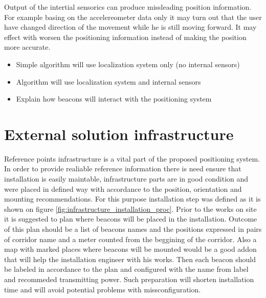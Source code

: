\documentclass[../main.tex]{subfiles}
\begin{document}
Output of the intertial sensorics can produce missleading position information. For example basing on the accelereometer data only it may turn out that the user have changed direction of the movement while he is still moving forward. It may effect with worsen the positioning information instead of making the position more accurate.

\begin{itemize}
	\item Simple algorithm will use localization system only (no internal sensors)
	\item Algorithm will use localization system and internal sensors
	\item Explain how beacons will interact with the positioning system
\end{itemize}


\section{External solution infrastructure} %
\label{sec:external_solution_infrastructure}

Reference points infrastructure is a vital part of the proposed positioning system. In order to provide realiable reference information there is need ensure that installation is easily maintable, infrastructure parts are in good condition and were placed in defined way with accordance to the position, orientation and mounting recommendations. For this purpose installation step was defined as it is shown on figure \ref{fig:infrastructure_installation_proc}. Prior to the works on site it is suggested to plan where beacons will be placed in the installation. Outcome of this plan should be a list of beacons names and the positions expressed in pairs of corridor name and a meter counted from the beggining of the corridor. Also a map with marked places where beacons will be mounted would be a good addon that will help the installation engineer with his works. Then each beacon should be labeled in accordance to the plan and configured with the name from label and recommeded transmitting power. Such preparation will shorten installation time and will avoid potential problems with missconfiguration.
\end{document}
